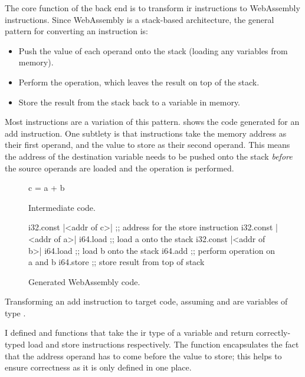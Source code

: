 \documentclass[00-main.tex]{subfiles}
\begin{document}
The core function of the back end is to transform \gls{ir} instructions to WebAssembly instructions.
Since WebAssembly is a stack-based architecture, the general pattern for converting an instruction is:
\begin{itemize}[nosep]
\item Push the value of each operand onto the stack (loading any variables from memory).
\item Perform the operation, which leaves the result on top of the stack.
\item Store the result from the stack back to a variable in memory.
\end{itemize}
Most instructions are a variation of this pattern.
 shows the code generated for an add instruction.
One subtlety is that  instructions take the memory address as their first operand, and the value to store as their second operand.
This means the address of the destination variable needs to be pushed onto the stack \emph{before} the source operands are loaded and the operation is performed.

\begin{listing}[h]
  \begin{subfigure}[b]{0.28\textwidth}
    \begin{IrCodeListing}
      c = a + b
    \end{IrCodeListing}
    \caption{Intermediate code.}
  \end{subfigure}
  \hfill
  \begin{subfigure}[b]{0.7\textwidth}
    \begin{WasmListing}
      i32.const |<addr of c>|  ;; address for the store instruction
      i32.const |<addr of a>|
      i64.load               ;; load a onto the stack
      i32.const |<addr of b>|
      i64.load               ;; load b onto the stack
      i64.add                ;; perform operation on a and b
      i64.store              ;; store result from top of stack
    \end{WasmListing}
    \caption{Generated WebAssembly code.}
  \end{subfigure}
  \caption{Transforming an add instruction to target code, assuming  and  are variables of type .}
  \label{lst:converting add instr to wasm code}
\end{listing}

I defined  and  functions that take the \gls{ir} type of a variable and return correctly-typed load and store instructions respectively.
The  function encapsulates the fact that the address operand has to come before the value to store; this helps to ensure correctness as it is only defined in one place.
\end{document}
